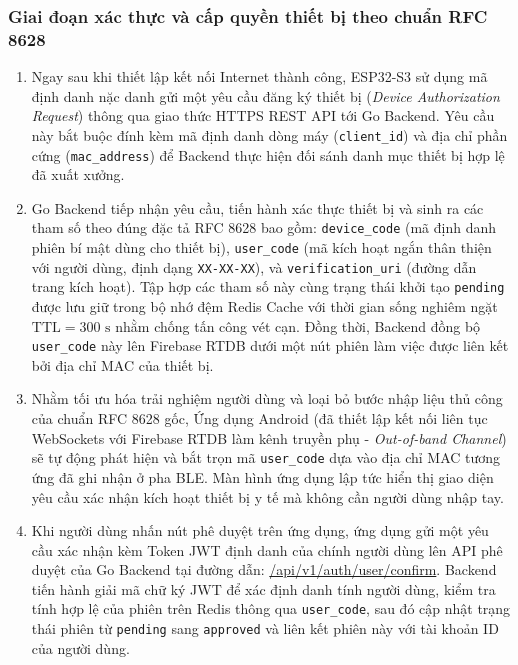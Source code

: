 \documentclass[a4paper,13pt,3p,oneside]{report}
\begin{document}
\subsubsection{Giai đoạn xác thực và cấp quyền thiết bị theo chuẩn RFC 8628}
\begin{enumerate}
    \item Ngay sau khi thiết lập kết nối Internet thành công, ESP32-S3 sử dụng mã định danh nặc danh gửi một yêu cầu đăng ký thiết bị (\textit{Device Authorization Request}) thông qua giao thức HTTPS REST API tới Go Backend. Yêu cầu này bắt buộc đính kèm mã định danh dòng máy (\texttt{client\_id}) và địa chỉ phần cứng (\texttt{mac\_address}) để Backend thực hiện đối sánh danh mục thiết bị hợp lệ đã xuất xưởng.
    
    \item Go Backend tiếp nhận yêu cầu, tiến hành xác thực thiết bị và sinh ra các tham số theo đúng đặc tả RFC 8628 bao gồm: \texttt{device\_code} (mã định danh phiên bí mật dùng cho thiết bị), \texttt{user\_code} (mã kích hoạt ngắn thân thiện với người dùng, định dạng \texttt{XX-XX-XX}), và \texttt{verification\_uri} (đường dẫn trang kích hoạt). Tập hợp các tham số này cùng trạng thái khởi tạo \texttt{pending} được lưu giữ trong bộ nhớ đệm Redis Cache với thời gian sống nghiêm ngặt $\text{TTL} = 300\text{ s}$ nhằm chống tấn công vét cạn. Đồng thời, Backend đồng bộ \texttt{user\_code} này lên Firebase RTDB dưới một nút phiên làm việc được liên kết bởi địa chỉ MAC của thiết bị.
    
    \item Nhằm tối ưu hóa trải nghiệm người dùng và loại bỏ bước nhập liệu thủ công của chuẩn RFC 8628 gốc, Ứng dụng Android (đã thiết lập kết nối liên tục WebSockets với Firebase RTDB làm kênh truyền phụ - \textit{Out-of-band Channel}) sẽ tự động phát hiện và bắt trọn mã \texttt{user\_code} dựa vào địa chỉ MAC tương ứng đã ghi nhận ở pha BLE. Màn hình ứng dụng lập tức hiển thị giao diện yêu cầu xác nhận kích hoạt thiết bị y tế mà không cần người dùng nhập tay.
    
    \item Khi người dùng nhấn nút phê duyệt trên ứng dụng, ứng dụng gửi một yêu cầu xác nhận kèm Token JWT định danh của chính người dùng lên API phê duyệt của Go Backend tại đường dẫn: \url{/api/v1/auth/user/confirm}. Backend tiến hành giải mã chữ ký JWT để xác định danh tính người dùng, kiểm tra tính hợp lệ của phiên trên Redis thông qua \texttt{user\_code}, sau đó cập nhật trạng thái phiên từ \texttt{pending} sang \texttt{approved} và liên kết phiên này với tài khoản ID của người dùng.
    

\end{enumerate}
\end{document}
